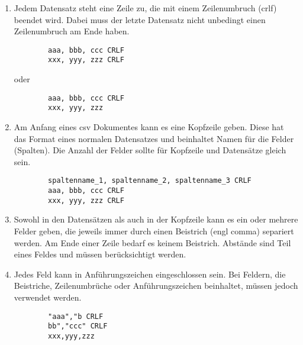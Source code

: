 \begin{enumerate}{}
	
	\item Jedem Datensatz steht eine Zeile zu, die mit einem Zeilenumbruch (\ac{crlf}) beendet wird. Dabei muss der letzte Datensatz nicht unbedingt einen Zeilenumbruch am Ende haben. \zB 
	\begin{lstlisting}
		aaa, bbb, ccc CRLF
		xxx, yyy, zzz CRLF
	\end{lstlisting}
	oder
	\begin{lstlisting}
		aaa, bbb, ccc CRLF
		xxx, yyy, zzz
	\end{lstlisting}
	
	\item Am Anfang eines \acs{csv} Dokumentes kann es eine Kopfzeile geben. Diese hat das Format eines normalen Datensatzes und beinhaltet Namen für die Felder (Spalten). Die Anzahl der Felder sollte für Kopfzeile und Datensätze gleich sein. \zB
	\begin{lstlisting}
		spaltenname_1, spaltenname_2, spaltenname_3 CRLF
		aaa, bbb, ccc CRLF
		xxx, yyy, zzz CRLF
	\end{lstlisting}
	
	\item Sowohl in den Datensätzen als auch in der Kopfzeile kann es ein oder mehrere Felder geben, die jeweils immer durch einen Beistrich (\acs{engl} comma) separiert werden. Am Ende einer Zeile bedarf es keinem Beistrich. Abstände sind Teil eines Feldes und müssen berücksichtigt werden.
	
	\item Jedes Feld kann in Anführungszeichen eingeschlossen sein. Bei Feldern, die Beistriche, Zeilenumbrüche oder Anführungszeichen beinhaltet, müssen jedoch verwendet werden. \zB
	\begin{lstlisting}
		"aaa","b CRLF
		bb","ccc" CRLF
		xxx,yyy,zzz
	\end{lstlisting}
\end{enumerate}




